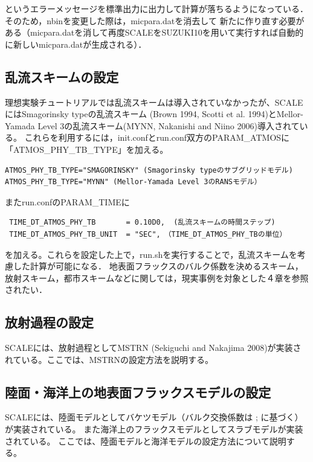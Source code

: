というエラーメッセージを標準出力に出力して計算が落ちるようになっている．そのため，nbinを変更した際は，micpara.datを消去して
新たに作り直す必要がある（micpara.datを消して再度SCALEをSUZUKI10を用いて実行すれば自動的に新しいmicpara.datが生成される）．


\subsection{乱流スキームの設定} \label{sec:adv_turbulence}
理想実験チュートリアルでは乱流スキームは導入されていなかったが、SCALEにはSmagorinsky typeの乱流スキーム
(Brown 1994, Scotti et al. 1994)とMellor-Yamada Level 3の乱流スキーム(MYNN, Nakanishi and Niino 2006)導入されている。
これらを利用するには，init.confとrun.conf双方のPARAM\_ATMOSに「ATMOS\_PHY\_TB\_TYPE」を加える。

\begin{verbatim}
ATMOS_PHY_TB_TYPE="SMAGORINSKY" (Smagorinsky typeのサブグリッドモデル)
ATMOS_PHY_TB_TYPE="MYNN" (Mellor-Yamada Level 3のRANSモデル）
\end{verbatim}

またrun.confのPARAM\_TIMEに

\begin{verbatim}
 TIME_DT_ATMOS_PHY_TB       = 0.10D0,  (乱流スキームの時間ステップ)
 TIME_DT_ATMOS_PHY_TB_UNIT  = "SEC",　（TIME_DT_ATMOS_PHY_TBの単位）
\end{verbatim}

を加える。これらを設定した上で，run.shを実行することで，乱流スキームを考慮した計算が可能になる．
地表面フラックスのバルク係数を決めるスキーム，放射スキーム，都市スキームなどに関しては，現実事例を対象とした４章を参照されたい．


\subsection{放射過程の設定} \label{sec:adv_radiation}
SCALEには、放射過程としてMSTRN (Sekiguchi and Nakajima 2008)が実装されている。ここでは、MSTRNの設定方法を説明する。



\subsection{陸面・海洋上の地表面フラックスモデルの設定} \label{sec:adv_landocean}
SCALEには、陸面モデルとしてバケツモデル（バルク交換係数は \cite{beljaars_1991}; \cite{wilson_2001}に基づく）が実装されている。
また海洋上のフラックスモデルとしてスラブモデルが実装されている。
ここでは、陸面モデルと海洋モデルの設定方法について説明する。


